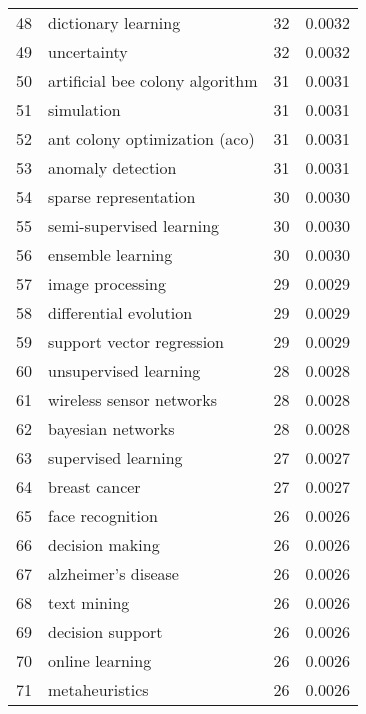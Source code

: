 \begin{tabular}{llrr}
48 &              dictionary learning &          32 &      0.0032 \\
49 &                      uncertainty &          32 &      0.0032 \\
50 &  artificial bee colony algorithm &          31 &      0.0031 \\
51 &                       simulation &          31 &      0.0031 \\
52 &    ant colony optimization (aco) &          31 &      0.0031 \\
53 &                anomaly detection &          31 &      0.0031 \\
54 &            sparse representation &          30 &      0.0030 \\
55 &         semi-supervised learning &          30 &      0.0030 \\
56 &                ensemble learning &          30 &      0.0030 \\
57 &                 image processing &          29 &      0.0029 \\
58 &           differential evolution &          29 &      0.0029 \\
59 &        support vector regression &          29 &      0.0029 \\
60 &            unsupervised learning &          28 &      0.0028 \\
61 &         wireless sensor networks &          28 &      0.0028 \\
62 &                bayesian networks &          28 &      0.0028 \\
63 &              supervised learning &          27 &      0.0027 \\
64 &                    breast cancer &          27 &      0.0027 \\
65 &                 face recognition &          26 &      0.0026 \\
66 &                  decision making &          26 &      0.0026 \\
67 &              alzheimer's disease &          26 &      0.0026 \\
68 &                      text mining &          26 &      0.0026 \\
69 &                 decision support &          26 &      0.0026 \\
70 &                  online learning &          26 &      0.0026 \\
71 &                   metaheuristics &          26 &      0.0026 \\

\end{tabular}
